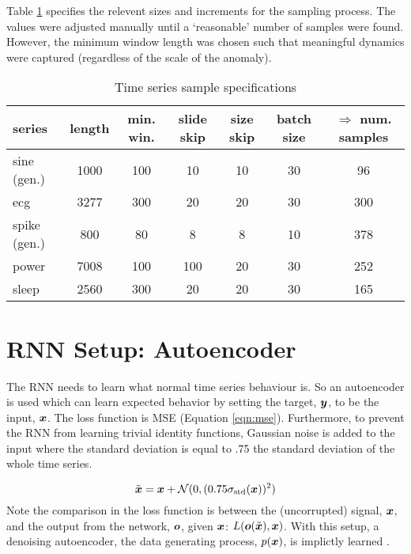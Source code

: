 Table \ref{tbl:winspec} specifies the relevent sizes and increments for the sampling process.
%
The values were adjusted manually until a `reasonable' number of samples were found.
%
However, the minimum window length was chosen such that meaningful dynamics were captured (regardless of the scale of the anomaly).

\begin{table}[H]
\centering
\begin{tabular}{|l||c|c|c|c|c||c|}
  \hline
  series & length & min. win. & slide skip & size skip & batch size & $\Rightarrow$ num. samples
  \\ \hline \hline
  sine (gen.) & 1000 & 100 & 10 & 10 & 30 & 96 
  \\ \hline
  ecg \cite{PhysioNet} & 3277 & 300 & 20 & 20 & 30 & 300
  \\ \hline
  spike (gen.) & 800 & 80 & 8 & 8 & 10 & 378
  \\ \hline
  power \cite{Keogh2005} & 7008 & 100 & 100 & 20 & 30 & 252
  \\ \hline
  sleep \cite{this} & 2560 & 300 & 20 & 20 & 30 & 165
  \\ \hline
\end{tabular}
\caption[]{Time series sample specifications} %
\label{tbl:winspec}
\end{table}


\section{RNN Setup: Autoencoder}

The RNN needs to learn what normal time series behaviour is.
%
So an autoencoder is used which can learn expected behavior by setting the target, $\boldsymbol{y}$, to be the input, $\boldsymbol{x}$.
%
The loss function is MSE (Equation \ref{eqn:mse}).
%
Furthermore, to prevent the RNN from learning trivial identity functions, Gaussian noise is added to the input where the standard deviation is equal to .75 the standard deviation of the whole time series.

\begin{equation*}
 \tilde{\boldsymbol{x}} = \boldsymbol{x}
 + \mathcal{N}(0,(0.75\sigma_{\mathrm{std}}(\boldsymbol{x}))^2)
\end{equation*}
\noindent
%
Note the comparison in the loss function is between the (uncorrupted) signal, $\boldsymbol{x}$, and the output from the network, $\boldsymbol{o}$, given $\boldsymbol{x}$: $L(\boldsymbol{o}(\tilde{\boldsymbol{x}}),\boldsymbol{x})$.
%
With this setup, a denoising autoencoder, the data generating process, $p(\boldsymbol{x})$, is implictly learned \cite{Bengio2013}.


